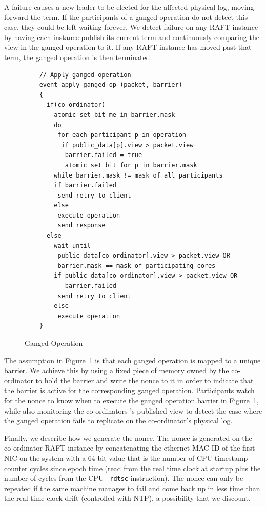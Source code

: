 \documentclass[letterpaper,twocolumn,10pt]{article}
\begin{document}
A failure causes a new leader to be elected for the affected physical
log, moving forward the term. If the participants of a ganged
operation do not detect this case, they could be left waiting
forever. We detect failure on any RAFT instance by having each
instance publish its current term and continuously comparing the view
in the ganged operation to it. If any RAFT instance has moved past
that term, the ganged operation is then terminated.

\begin{figure}
  \centering
  \scriptsize
  \bf
\begin{verbatim}
    // Apply ganged operation
    event_apply_ganged_op (packet, barrier)
    {
      if(co-ordinator)
        atomic set bit me in barrier.mask         
        do
         for each participant p in operation
          if public_data[p].view > packet.view
           barrier.failed = true 
           atomic set bit for p in barrier.mask
        while barrier.mask != mask of all participants
        if barrier.failed
         send retry to client
        else       
         execute operation
         send response
      else
        wait until 
         public_data[co-ordinator].view > packet.view OR
         barrier.mask == mask of participating cores
        if public_data[co-ordinator].view > packet.view OR
           barrier.failed
         send retry to client
        else
         execute operation
    }
\end{verbatim}
\caption{Ganged Operation}
\label{fig:ganged_ops}
\end{figure}

The assumption in Figure~\ref{fig:ganged_ops} is that each ganged
operation is mapped to a unique barrier. We achieve this by using a
fixed piece of memory owned by the co-ordinator to hold the barrier
and write the nonce to it in order to indicate that the barrier is
active for the corresponding ganged operation. Participants watch for
the nonce to know when to execute the ganged operation barrier in
Figure~\ref{fig:ganged_ops}, while also monitoring the co-ordinators
's published view to detect the case where the ganged operation fails
to replicate on the co-ordinator's physical log.

Finally, we describe how we generate the nonce. The nonce is generated
on the co-ordinator RAFT instance by concatenating the ethernet MAC ID
of the first NIC on the system with a 64 bit value that is the number
of CPU timestamp counter cycles since epoch time (read from the real
time clock at startup plus the number of cycles from the CPU {\tt
  rdtsc} instruction). The nonce can only be repeated if the same
machine manages to fail and come back up in less time than the real
time clock drift (controlled with NTP), a possibility that we
discount.
\end{document}
